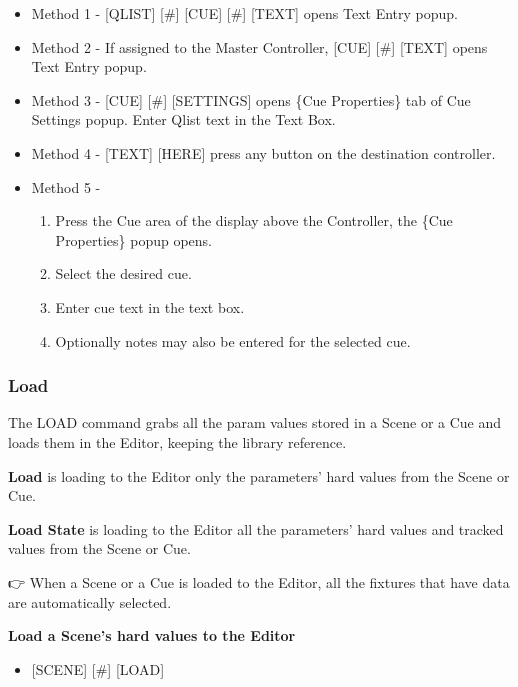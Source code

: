\documentclass[
]{article}
\providecommand{\tightlist}{%
  \setlength{\itemsep}{0pt}\setlength{\parskip}{0pt}}
\begin{document}
\begin{itemize}
\item
  Method 1 - {[}QLIST{]} {[}\#{]} {[}CUE{]} {[}\#{]} {[}TEXT{]} opens Text Entry popup.
\item
  Method 2 - If assigned to the Master Controller, {[}CUE{]} {[}\#{]} {[}TEXT{]} opens Text Entry popup.
\item
  Method 3 - {[}CUE{]} {[}\#{]} {[}SETTINGS{]} opens \{Cue Properties\} tab of Cue Settings popup. Enter Qlist text in the Text Box.
\item
  Method 4 - {[}TEXT{]} {[}HERE{]} press any button on the destination controller.
\item
  Method 5 -

  \begin{enumerate}
  \def\labelenumi{\arabic{enumi}.}
  \item
    Press the Cue area of the display above the Controller, the \{Cue Properties\} popup opens.
  \item
    Select the desired cue.
  \item
    Enter cue text in the text box.
  \item
    Optionally notes may also be entered for the selected cue.
  \end{enumerate}
\end{itemize}

\hypertarget{load}{%
\subsubsection{Load}\label{load}}

The LOAD command grabs all the param values stored in a Scene or a Cue and loads them in the Editor, keeping the library reference.

\textbf{Load} is loading to the Editor only the parameters' hard values from the Scene or Cue.

\textbf{Load State} is loading to the Editor all the parameters' hard values and tracked values from the Scene or Cue.

👉 When a Scene or a Cue is loaded to the Editor, all the fixtures that have data are automatically selected.

\textbf{Load a Scene's hard values to the Editor}

\begin{itemize}
\tightlist
\item
  {[}SCENE{]} {[}\#{]} {[}LOAD{]}
\end{itemize}
\end{document}
